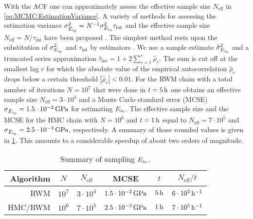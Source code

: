 \par %
With the ACF one can approximately assess the effective sample size \(N_{\mathrm{eff}}\) in \cref{eq:MCMC:EstimationVariance}.
A variety of methods for assessing the estimation variance \(\sigma^2_{\bar{E}_{i_0}} = N^{-1} \sigma^2_{E_{i_0}} \tau_{\mathrm{int}}\)
and the effective sample size \(N_{\mathrm{eff}} = N / \tau_{\mathrm{int}}\) have been proposed \cite{MCMC:Flegal2008,MCMC:Flegal2010}.
The simplest method rests upon the substitution of \(\sigma^2_{E_{i_0}}\) and \(\tau_{\mathrm{int}}\) by estimators \cite{MCMC:Ripley1987,MCMC:Kass1998}.
We use a sample estimate \(\hat{\sigma}^2_{E_{i_0}}\) and a truncated series approximation \(\hat{\tau}_{\mathrm{int}} = 1 + 2 \sum_{s=1}^r \hat{\rho}_s\).
The sum is cut off at the smallest lag \(r\) for which the absolute value of the empirical autocorrelation \(\hat{\rho}_r\) drops below a certain threshold \(\left| \hat{\rho}_r \right| < 0.01\).
For the RWM chain with a total number of iterations \(N=10^7\) that were done in \(t = \unit[5]{h}\) one obtains an effective sample size \(N_{\mathrm{eff}} = 3 \cdot 10^4\)
and a Monte Carlo standard error (MCSE) \(\sigma_{\bar{E}_{\analyzed}} = \unit[1.5 \cdot 10^{-2}]{GPa}\) for estimating \(E_{\analyzed}\).
The effective sample size and the MCSE for the HMC chain with \(N=10^6\) and \(t = \unit[1]{h}\) equal to \(N_{\mathrm{eff}} = 7 \cdot 10^5\) and \(\sigma_{\bar{E}_{\analyzed}} = \unit[2.5 \cdot 10^{-3}]{GPa}\), respectively.
A summary of those rounded values is given in \cref{tab:EffiencySummary}.
This amounts to a considerable speedup of about two orders of magnitude.
\begin{table}[htbp]
  \caption[Summary of sampling \(E_{\analyzed}\)]{Summary of sampling \(E_{\analyzed}\).}
  \label{tab:EffiencySummary}
  \centering
    \begin{tabular}{rccccc}
      \toprule
      Algorithm & \(N\) & \(N_{\mathrm{eff}}\) & MCSE & \(t\) & \(N_{\mathrm{eff}} / t\) \\
      \midrule
          RWM & \(10^7\) & \(3 \cdot 10^4\) & \(\unit[1.5 \cdot 10^{-2}]{GPa}\) & \(\unit[5]{h}\) & \(\unit[6 \cdot 10^3]{h^{-1}}\) \\
      HMC/RWM & \(10^6\) & \(7 \cdot 10^5\) & \(\unit[2.5 \cdot 10^{-3}]{GPa}\) & \(\unit[1]{h}\) & \(\unit[7 \cdot 10^5]{h^{-1}}\) \\
      \bottomrule
    \end{tabular}
\end{table}
